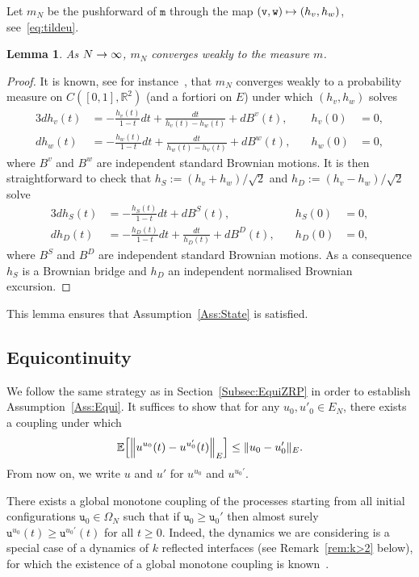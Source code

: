 \documentclass[10pt]{amsart}
\newtheorem{lemm}[theo]{Lemma}\newtheorem{prop}[theo]{Proposition}\newtheorem{coro}[theo]{Corollary}\newtheorem{conj}[theo]{Conjecture}
\theoremstyle{definition}\newtheorem{defi}[theo]{Definition}\newtheorem{rema}[theo]{Remark}\newtheorem{exam}[theo]{Example}\newtheorem{exem}[theo]{Example}\newtheorem{nota}[theo]{Notation}
\theoremstyle{plain}
\newcommand{\ttv}{\mathtt{v}}
\newcommand{\ttw}{\mathtt{w}}
\newcommand{\ttu}{\mathtt{u}}
\newcommand{\ttm}{\mathtt{m}}
\newcommand{\tu}{\mathtt{u}}
\newcommand{\R}{\mathbb{R}}
\newcommand{\E}{\mathbb{E}}
\let\originalleft\left
\let\originalright\right
\renewcommand{\left}{\mathopen{}\mathclose\bgroup\originalleft}
\renewcommand{\right}{\aftergroup\egroup\originalright}
\renewcommand*{\to}{\mathchoice{\longrightarrow}{\rightarrow}{\rightarrow}{\rightarrow}}
\let\oldmapsto\mapsto
\renewcommand*{\mapsto}{\mathchoice{\longmapsto}{\oldmapsto}{\oldmapsto}{\oldmapsto}}
\begin{document}
Let $m_N$ be the pushforward of $\ttm$ through the map $(\ttv,\ttw)\mapsto(h_v,h_w)$, see~\eqref{eq:tildeu}.

\begin{lemm}\label{lemma:CVInvMeas}
As $N\to\infty$, $m_N$ converges weakly to the measure $m$.
\end{lemm}
\begin{proof}
It is known, see for instance~\cite[Theorem~2.7]{Gillet03}, that $m_N$ converges weakly to a probability measure on $C([0,1],\R^2)$ (and a fortiori on $E$) under which $(h_v,h_w)$ solves
\begin{alignat*}{3}
dh_v(t) &= - \frac{h_v(t)}{1-t} dt + \frac{dt}{h_v(t)-h_w(t)} + dB^v(t),\quad &h_v(0) &= 0,\\
dh_w(t) &= - \frac{h_w(t)}{1-t} dt + \frac{dt}{h_w(t)-h_v(t)} + dB^w(t),\quad &h_w(0)&=0,
\end{alignat*}
where $B^v$ and $B^w$ are independent standard Brownian motions. It is then straightforward to check that $h_S:=(h_v+h_w)/\sqrt{2}$ and $h_D:=(h_v-h_w)/\sqrt{2}$ solve
\begin{alignat*}{3}
dh_S(t) &= - \frac{h_S(t)}{1-t} dt + dB^S(t),\quad &h_S(0) &= 0,\\
dh_D(t) &= - \frac{h_D(t)}{1-t} dt + \frac{dt}{h_D(t)} + dB^D(t),\quad &h_D(0)&=0,
\end{alignat*}
where $B^S$ and $B^D$ are independent standard Brownian motions. As a consequence $h_S$ is a Brownian bridge and $h_D$ an independent normalised Brownian excursion.
\end{proof}

This lemma ensures that Assumption~\ref{Ass:State} is satisfied.

\subsection{Equicontinuity}\label{Subsec:EquiPair}

We follow the same strategy as in Section~\ref{Subsec:EquiZRP} in order to establish Assumption~\ref{Ass:Equi}. It suffices to show that for any $u_0,u'_0 \in E_N$, there exists a coupling under which
\begin{equation}\label{Eq:DecayPair}
\E\left[\left\|u^{u_0}(t) - u^{u_0'}(t) \right\|_{E}\right] \le \|u_0-u_0'\|_E.
\end{equation}
From now on, we write $u$ and $u'$ for $u^{u_0}$ and $u^{u_0'}$.

There exists a global monotone coupling of the processes starting from all initial configurations $\tu_0\in\Omega_N$ such that if $\tu_0 \ge \tu_0'$ then almost surely $\ttu^{u_0}(t) \ge \ttu^{u_0'}(t)$ for all $t\ge 0$. Indeed, the dynamics we are considering is a special case of a dynamics of $k$ reflected interfaces (see Remark~\ref{rem:k>2} below), for which the existence of a global monotone coupling is known~\cite{wilson2004mixing}.
\end{document}
